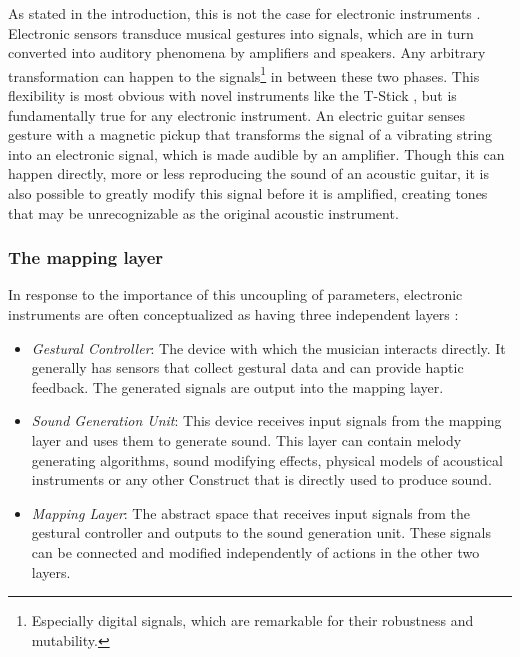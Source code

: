 As stated in the introduction, this is not the case for electronic instruments . Electronic sensors transduce musical gestures into signals, which are in turn converted into auditory phenomena by amplifiers and speakers. Any arbitrary transformation can happen to the signals\footnote{Especially digital signals, which are remarkable for their robustness and mutability.} in between these two phases. This flexibility is most obvious with novel instruments like the T-Stick \cite{malloch_ma_thesis}, but is fundamentally true for any electronic instrument. An electric guitar senses gesture with a magnetic pickup that transforms the signal of a vibrating string into an electronic signal, which is made audible by an amplifier. Though this can happen directly, more or less reproducing the sound of an acoustic guitar, it is also possible to greatly modify this signal before it is amplified, creating tones that may be unrecognizable as the original acoustic instrument.

	\subsubsection{The mapping layer}

In response to the importance of this uncoupling of parameters, electronic instruments are often conceptualized as having three independent layers \cite{gestural_control_sound_synthesis}: 

	\begin{itemize}
		\item \emph{Gestural Controller}: The device with which the musician interacts directly. It generally has sensors that collect gestural data and can provide haptic feedback. The generated signals are output into the mapping layer.
		\item \emph{Sound Generation Unit}: This device receives input signals from the mapping layer and uses them to generate sound. This layer can contain melody generating algorithms, sound modifying effects, physical models of acoustical instruments or any other Construct that is directly used to produce sound.
		\item \emph{Mapping Layer}: The abstract space that receives input signals from the gestural controller and outputs to the sound generation unit. These signals can be connected and modified independently of actions in the other two layers.
	\end{itemize}

